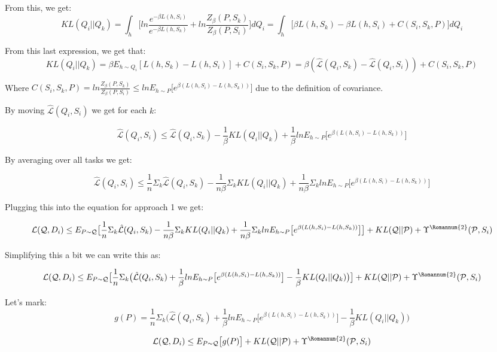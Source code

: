 \documentclass[letterpaper]{article}
\theoremstyle{definition}
\begin{document}
From this, we get: 
$$KL(Q_i||Q_k)=\int_h \bigl [ ln\frac{e^{-\beta L(h,S_i)}}{e^{-\beta L(h,S_k)} }+ln \frac{Z_{\beta}(P,S_k)}{Z_{\beta}(P,S_i)} \bigr ] dQ_i=\int_h \bigl [ \beta L(h,S_k)-\beta L(h,S_i) +C(S_i,S_k,P) \bigr ] dQ_i$$

From this last expression, we get that:
$$KL(Q_i||Q_k)=\beta E_{h\sim Q_i}[L(h,S_k)-L(h,S_i)]+C(S_i,S_k,P)=\beta (\hat{\mathcal{L}}(Q_i,S_k)-\hat{\mathcal{L}}(Q_i,S_i))+C(S_i,S_k,P)$$

Where $C(S_i,S_k,P)=ln\frac{Z_{\beta}(P,S_k)}{ Z_{\beta}(P,S_i)}\leq ln E_{h\sim P} \bigl [e^{\beta (L(h,S_i)-L(h,S_k))} \bigr ]$ due to the definition of covariance.

By moving $\hat{\mathcal{L}}(Q_i,S_i)$ we get for each $k$:

$$ \hat{\mathcal{L}}(Q_i,S_i)\leq \hat{\mathcal{L}}(Q_i,S_k) - \frac{1}{\beta} KL(Q_i||Q_k) + \frac{1}{\beta}ln E_{h\sim P} \bigl [e^{\beta (L(h,S_i)-L(h,S_k))} \bigr ]$$

By averaging over all tasks we get:

$$ \hat{\mathcal{L}}(Q_i,S_i)\leq \frac{1}{n}\Sigma_k\hat{\mathcal{L}}(Q_i,S_k) - \frac{1}{n\beta} \Sigma_k KL(Q_i||Q_k) + \frac{1}{n\beta}\Sigma_k ln E_{h\sim P} \bigl [e^{\beta (L(h,S_i)-L(h,S_k))} \bigr ]$$

Plugging this into the equation for approach 1 we get:

$$ \mathcal{L}(\mathcal{Q}, D_i)\leq E_{P\sim \mathcal{Q}} \bigl [\frac{1}{n}\Sigma_k\hat{\mathcal{L}}(Q_i,S_k) - \frac{1}{n\beta} \Sigma_k KL(Q_i||Q_k) + \frac{1}{n\beta}\Sigma_k ln E_{h\sim P} \bigl [e^{\beta (L(h,S_i)-L(h,S_k))} \bigr ] \bigr ]+ KL(\mathcal{Q}||\mathcal{P})+\Upsilon^{\text{\Romannum{2}}}(\mathcal{P}, S_i)$$

Simplifying this a bit we can write this as:


$$ \mathcal{L}(\mathcal{Q}, D_i)\leq E_{P\sim \mathcal{Q}}\bigl [\frac{1}{n}\Sigma_k \bigl ( \hat{\mathcal{L}}(Q_i,S_k) + \frac{1}{\beta} ln E_{h\sim P}\bigl [e^{\beta (L(h,S_i)-L(h,S_k))} \bigr ] -   \frac{1}{\beta}  KL(Q_i||Q_k) \bigr ) \bigr ] + KL(\mathcal{Q}||\mathcal{P})+\Upsilon^{\text{\Romannum{2}}}(\mathcal{P}, S_i)$$

Let's mark:
$$g(P)=\frac{1}{n}\Sigma_k \bigl ( \hat{\mathcal{L}}(Q_i,S_k) + \frac{1}{\beta} ln E_{h\sim P}\bigl [e^{\beta (L(h,S_i)-L(h,S_k))} \bigr ] -   \frac{1}{\beta}  KL(Q_i||Q_k) \bigr )$$

$$ \mathcal{L}(\mathcal{Q}, D_i)\leq E_{P\sim \mathcal{Q}}\bigl [g(P) \bigr ] + KL(\mathcal{Q}||\mathcal{P})+\Upsilon^{\text{\Romannum{2}}}(\mathcal{P}, S_i)$$
\end{document}
